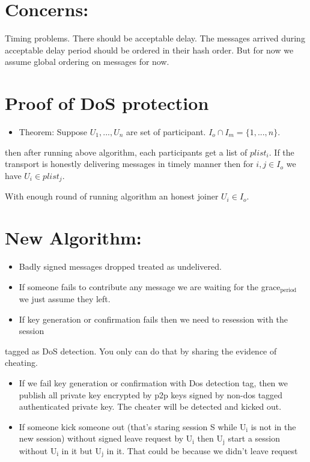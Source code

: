 \documentclass[11pt]{article}
\begin{document}
\section{Concerns:}
\label{sec-5}
Timing problems. There should be acceptable delay. The messages arrived during 
acceptable delay period should be ordered in their hash order. But for now we 
assume global ordering on messages for now.

\section{Proof of DoS protection}
\label{sec-6}
\begin{itemize}
\item Theorem: Suppose $U_1,...,U_n$ are set of participant. $I_o \cap I_m = \{1,...,n\}$.
\end{itemize}
then after running above algorithm, each participants get a list of $plist_i$. If
the transport is honestly delivering messages in timely manner then for $i,j \in I_o$ 
we have $U_i \in plist_j$.

With enough round of running algorithm an honest joiner $U_i \in I_o$.

\section{New Algorithm:}
\label{sec-7}
\begin{itemize}
\item Badly signed messages dropped treated as undelivered.
\item If someone fails to contribute any message we are waiting for the grace$_{\text{period}}$
    we just assume they left.
\item If key generation or confirmation fails then we need to resession with the session
\end{itemize}
tagged as DoS detection. You only can do that by sharing the evidence of cheating.
\begin{itemize}
\item If we fail key generation or confirmation with Dos detection tag, then we publish
all private key encrypted by p2p keys signed by non-dos tagged authenticated
private key. The cheater will be detected and kicked out.
\item If someone kick someone out (that's staring session S while U$_{\text{i}}$ is not in the 
new session) without signed leave request by U$_{\text{i}}$ then U$_{\text{j}}$ start a session without
U$_{\text{i}}$ in it but U$_{\text{j}}$ in it. That could be because we didn't leave request
\end{itemize}
\end{document}

